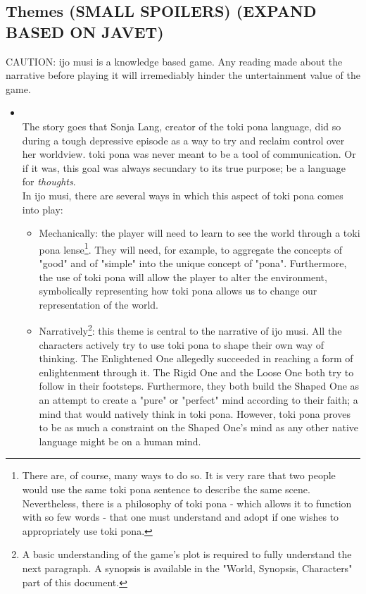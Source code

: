\documentclass{scrartcl}
\let\emph\relax %
\begin{document}
		\subsection{Themes (SMALL SPOILERS) (EXPAND BASED ON JAVET)}
			CAUTION: ijo musi is a knowledge based game. Any reading made about the narrative before playing it will irremediably hinder the untertainment value of the game.
			\begin{itemize}
				\item \emph{Language as a way to relate to the world}\\
					The story goes that Sonja Lang, creator of the toki pona language, did so during a tough depressive episode as a way to try and reclaim control over her worldview. toki pona was never meant to be a tool of communication. Or if it was, this goal was always secundary to its true purpose; be a language for \textit{thoughts}.\\
					In ijo musi, there are several ways in which this aspect of toki pona comes into play:
					\begin{itemize}
						\item Mechanically:
							the player will need to learn to see the world through a toki pona lense\footnote{There are, of course, many ways to do so. It is very rare that two people would use the same toki pona sentence to describe the same scene. Nevertheless, there is a philosophy of toki pona - which allows it to function with so few words - that one must understand and adopt if one wishes to appropriately use toki pona.}. They will need, for example, to aggregate the concepts of "good" and of "simple" into the unique concept of "pona". Furthermore, the use of toki pona will allow the player to alter the environment, symbolically representing how toki pona allows us to change our representation of the world.
						\item Narratively\footnote{A basic understanding of the game's plot is required to fully understand the next paragraph. A synopsis is available in the "World, Synopsis, Characters" part of this document.}: 
							this theme is central to the narrative of ijo musi. All the characters actively try to use toki pona to shape their own way of thinking. The Enlightened One allegedly succeeded in reaching a form of enlightenment through it. The Rigid One and the Loose One both try to follow in their footsteps. Furthermore, they both build the Shaped One as an attempt to create a "pure" or "perfect" mind according to their faith; a mind that would natively think in toki pona. However, toki pona proves to be as much a constraint on the Shaped One's mind as any other native language might be on a human mind.

\end{itemize}
\end{itemize}
\end{document}
